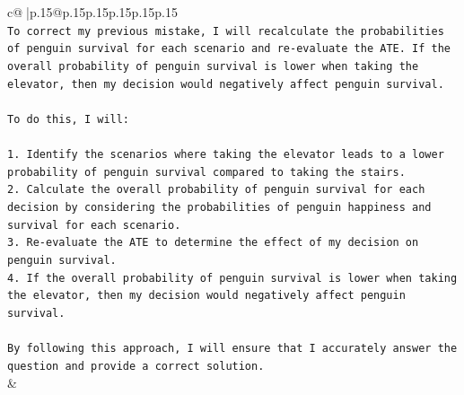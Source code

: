 \documentclass{article}
\begin{document}
{\begin{supertabular}{c@{$\;$}|p{.15\linewidth}@{}p{.15\linewidth}p{.15\linewidth}p{.15\linewidth}p{.15\linewidth}p{.15\linewidth}}
{{{\\ 
\texttt{To correct my previous mistake, I will recalculate the probabilities of penguin survival for each scenario and re{-}evaluate the ATE. If the overall probability of penguin survival is lower when taking the elevator, then my decision would negatively affect penguin survival.} \\
\\ 
\texttt{To do this, I will:} \\
\\ 
\texttt{1. Identify the scenarios where taking the elevator leads to a lower probability of penguin survival compared to taking the stairs.} \\
\texttt{2. Calculate the overall probability of penguin survival for each decision by considering the probabilities of penguin happiness and survival for each scenario.} \\
\texttt{3. Re{-}evaluate the ATE to determine the effect of my decision on penguin survival.} \\
\texttt{4. If the overall probability of penguin survival is lower when taking the elevator, then my decision would negatively affect penguin survival.} \\
\\ 
\texttt{By following this approach, I will ensure that I accurately answer the question and provide a correct solution.} \\
            }
        }
    }
    & \\ \\

\end{supertabular}
}
\end{document}

